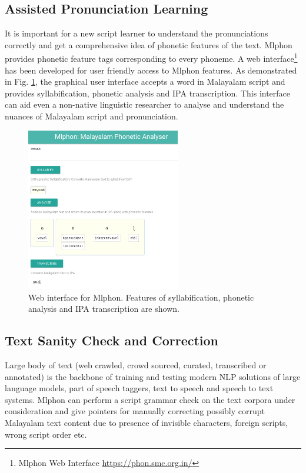 \subsection{Assisted Pronunciation Learning}

It is important for a new script learner to understand the pronunciations
correctly and get a comprehensive idea of phonetic features of the text. Mlphon
provides phonetic feature tags corresponding to every phoneme. A web
interface\footnote {Mlphon Web Interface \url{https://phon.smc.org.in/}} has
been developed for user friendly access to Mlphon features. As demonstrated in
Fig. \ref{fig:mlphon-web}, the graphical user interface accepts a word in Malayalam
script and provides syllabification, phonetic analysis and IPA transcription. This interface can aid even a non-native linguistic researcher to analyse and
understand the nuances of Malayalam script and pronunciation.

\begin{figure}[htpb]
	\centering
	\includegraphics[width=0.6\textwidth]{mlphon-web.png}
	\caption{Web interface for Mlphon. Features of syllabification, phonetic analysis and IPA transcription are shown.}
	\label{fig:mlphon-web}
\end{figure}




\subsection{Text Sanity Check and Correction}

Large body of text (web crawled, crowd sourced, curated, transcribed or
annotated) is the backbone of training and testing modern NLP solutions of
large language models, part of speech taggers, text to speech and speech to
text systems. Mlphon can perform a script grammar check on the text corpora
under consideration and give pointers for manually correcting possibly corrupt
Malayalam text content due to presence of invisible characters, foreign
scripts, wrong script order etc.

